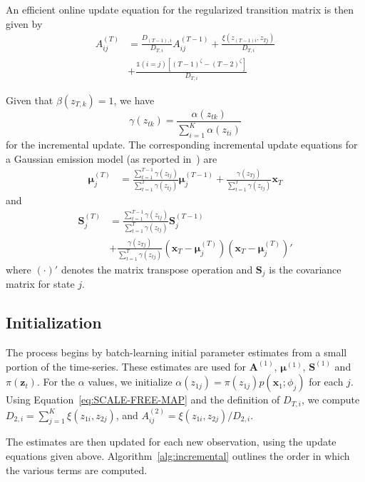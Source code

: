 \documentclass{article}
\begin{document}
An efficient online update equation for the regularized transition matrix is then given by
\begin{align*}
    A_{ij}^{(T)} &= \frac{D_{(T-1), i}}{D_{T,i}}A_{ij}^{(T-1)}
    + \frac{\xi(z_{(T-1)i}, z_{Tj})}{D_{T,i}} \\
                 &+ \frac{\mathds{1}(i = j)[(T-1)^\zeta - (T-2)^\zeta]}{D_{T,i}}
\end{align*}

Given that $\beta(z_{T,k}) = 1$, we have 
\[
    \gamma(z_{tk}) = \frac{\alpha(z_{tk})}{\sum_{i=1}^{K}\alpha(z_{ti})}
\]
for the incremental update. The corresponding incremental update equations for a Gaussian emission model (as reported in~\cite{stenger2001}) are 
\begin{align*}
    \mathbf{\mu}_{j}^{(T)} &= \frac{\sum_{t=1}^{T-1}\gamma(z_{tj})}{\sum_{t=1}^{T}\gamma(z_{tj})}\mathbf{\mu}_{j}^{(T-1)} + \frac{\gamma(z_{Tj})}{\sum_{t=1}^{T}\gamma(z_{tj})}\mathbf{x}_T
\end{align*}
and
\begin{align*}
    \mathbf{S}_j^{(T)} &= \frac{\sum_{t=1}^{T-1}\gamma(z_{tj})}{\sum_{t=1}^{T}\gamma(z_{tj})}\mathbf{S}_j^{(T-1)} \\
                       &+ \frac{\gamma(z_{Tj})}{\sum_{t=1}^{T}\gamma(z_{tj})}\left(\mathbf{x}_T - \mathbf{\mu}_j^{(T)}\right)\left(\mathbf{x}_T - \mathbf{\mu}_j^{(T)}\right)'
\end{align*}
where $(\cdot)'$ denotes the matrix transpose operation and $\mathbf{S}_j$ is the covariance matrix for state $j$.

\subsection{Initialization}

The process begins by batch-learning initial parameter estimates from a small
portion of the time-series. These estimates are used for $\mathbf{A}^{(1)}$,
$\mathbf{\mu}^{(1)}$, $\mathbf{S}^{(1)}$ and $\pi(\mathbf{z}_t)$. For the
$\alpha$ values, we initialize $\alpha(z_{1j}) = \pi(z_{1j})p(\mathbf{x}_1;
\phi_j)$ for each $j$. Using Equation~\ref{eq:SCALE-FREE-MAP} and the definition
of $D_{T,i}$, we compute $D_{2,i} = \sum_{j=1}^{K} \xi(z_{1i}, z_{2j})$, and 
$A_{ij}^{(2)} = \xi(z_{1i}, z_{2j})/D_{2,i}$.

The estimates are then updated for each new observation, using the update equations given above. Algorithm~\ref{alg:incremental} outlines the order in which the various terms are computed.
\end{document}
